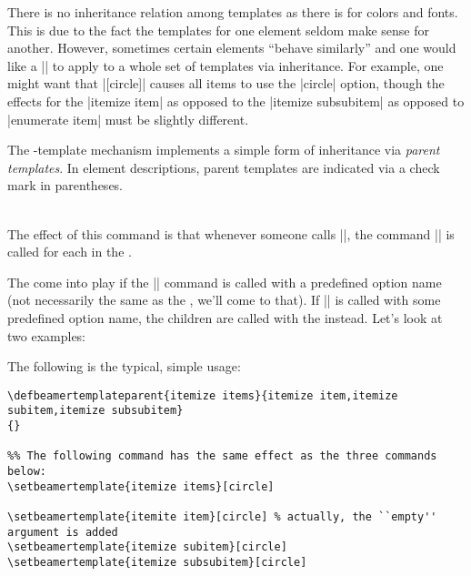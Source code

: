 There is no inheritance relation among templates as there is for colors and fonts. This is due to the fact the templates for one element seldom make sense for another. However, sometimes certain elements ``behave similarly'' and one would like a |\setbeamertemplate| to apply to a whole set of templates via inheritance. For example, one might want that |[circle]| causes all items to use the |circle| option, though the effects for the |itemize item| as opposed to the |itemize subsubitem| as opposed to |enumerate item| must be slightly different.

The \beamer-template mechanism implements a simple form of inheritance via \emph{parent templates}. In element descriptions, parent templates are indicated via a check mark in parentheses.

\begin{command}{\\ }
  The effect of this command is that whenever someone calls ||, the command || is called for each  in the .

  The  come into play if the |\setbeamertemplate| command is called with a predefined option name (not necessarily the same as the , we'll come to that). If |\setbeamertemplate| is called with some predefined option name, the children are called with the  instead. Let's look at two examples:

  \example
  The following is the typical, simple usage:

\begin{verbatim}
\defbeamertemplateparent{itemize items}{itemize item,itemize subitem,itemize subsubitem}
{}

%% The following command has the same effect as the three commands below:
\setbeamertemplate{itemize items}[circle]

\setbeamertemplate{itemite item}[circle] % actually, the ``empty'' argument is added
\setbeamertemplate{itemize subitem}[circle]
\setbeamertemplate{itemize subsubitem}[circle]
\end{verbatim}


\end{command}
